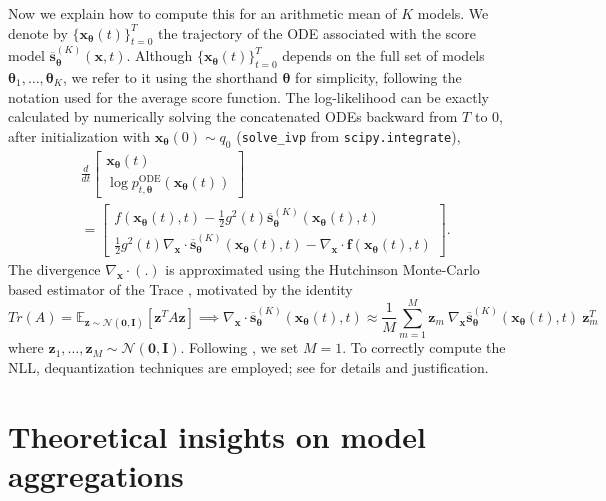 \documentclass[10pt]{article} %
\newcommand{\ODE}{\text{ODE}}
\def\rvx{{\mathbf{x}}}
\def\rvz{{\mathbf{z}}}
\def\vzero{{\bm{0}}}
\def\vtheta{{\bm{\theta}}}
\def\vs{{\bm{s}}}
\def\mI{{\bm{I}}}
\begin{document}
Now we explain how to compute this for an arithmetic mean of $K$ models. We denote by $\{\rvx_\vtheta(t)\}_{t=0}^T$ the trajectory of the ODE associated with the score model $\overline{\vs}^{(K)}_{\vtheta}(\rvx, t)$. Although $\{\rvx_\vtheta(t)\}_{t=0}^T$ depends on the full set of models $\vtheta_1, \dots, \vtheta_K$, we refer to it using the shorthand $\vtheta$ for simplicity, following the notation used for the average score function.
The log-likelihood can be exactly calculated by numerically solving the concatenated ODEs backward from \(T\) to \(0\), after initialization with \(\rvx_\vtheta(0) \sim q_0\) (\texttt{solve\_ivp} from \texttt{scipy.integrate}), 
\begin{align}
& \frac{d}{dt} 
\begin{bmatrix}
\rvx_\vtheta(t) \\ 
\log p_{t,\vtheta}^\ODE (\rvx_\vtheta(t))
\end{bmatrix} \\
& =
\begin{bmatrix}
f(\rvx_\vtheta(t), t) - \frac{1}{2} g^2(t) \overline{\vs}^{(K)}_{\vtheta}(\rvx_\vtheta(t), t) \\ 
\frac{1}{2} g^2(t) \nabla_{\rvx} \cdot \overline{\vs}^{(K)}_{\vtheta}(\rvx_\vtheta(t), t) - \nabla_{\rvx} \cdot \mathbf{f}(\rvx_\vtheta(t), t)
\end{bmatrix}.
\end{align}
The divergence $\nabla_{\rvx} \cdot (.)$ is approximated using the Hutchinson Monte-Carlo based estimator of the Trace \citep{hutchinson1989stochastic}, motivated by the identity 
\begin{equation}
Tr(A) = \mathbb{E}_{\mathbf{z}\sim \mathcal{N}(\vzero,\mI)}[\mathbf{z}^TA\mathbf{z}] \implies   \nabla_{\rvx} \cdot\overline{\vs}^{(K)}_{\vtheta}(\rvx_\vtheta(t), t) \approx \frac{1}{M}\sum_{m=1}^M \mathbf{z}_m \  \nabla_{\rvx}\overline{\vs}^{(K)}_{\vtheta}(\rvx_\vtheta(t), t)\ \mathbf{z}_m^T
\end{equation}
where $\rvz_1,\dots,\rvz_M \sim \mathcal{N}(\vzero,\mI)$. Following \citet{song2021scorebasedgenerativemodelingstochastic}, we set $M = 1$. To correctly compute the NLL, dequantization techniques are employed; see \citet{theis2016noteevaluationgenerativemodels} for details and justification.



\section{Theoretical insights on model aggregations} \label{app: theoretical insights}
\end{document}
